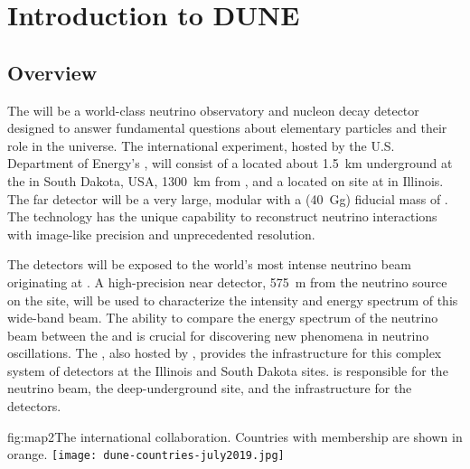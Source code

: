 \chapter{Introduction to DUNE}
\label{ch:exec-overall}

\section{Overview}
\label{sec:exec-overall-1}

The  will be a world-class neutrino observatory and nucleon decay detector designed to answer fundamental questions about elementary particles and their role in the universe. The international  experiment, hosted by the U.S. Department of Energy's , will consist of a  located about \SI{1.5}{km} underground at the  in South Dakota, USA, \SI{1300}{\km} from , and a  located on site at  in Illinois. The far detector will be a very large, modular  with a \fdfiducialmass (\SI{40}{\giga\gram}) fiducial mass of . The  technology 
has the unique capability to reconstruct neutrino interactions with image-like precision and unprecedented resolution. 

The  detectors will be exposed to the world's most intense neutrino beam originating at . A high-precision near detector, \SI{575}{m} from the neutrino source on the  site, will be used to characterize the intensity and energy spectrum of this wide-band beam. The ability to compare the energy spectrum of the neutrino beam between the  and 
is crucial for discovering new phenomena in neutrino oscillations. The , also hosted by , provides the infrastructure for this complex system of detectors at the Illinois and South Dakota sites.  is responsible for the neutrino beam, the deep-underground site, and the infrastructure for the  detectors. 

\begin{dunefigure}{fig:map2}{The international 
collaboration. Countries with  membership are shown in orange.}
\texttt{[image: dune-countries-july2019.jpg]}  
\end{dunefigure} %

